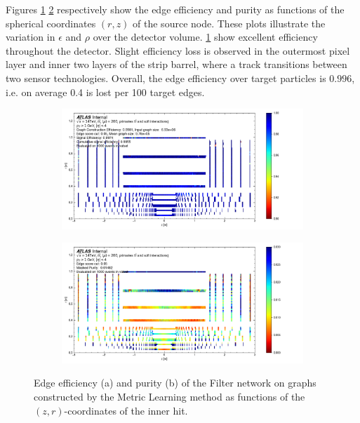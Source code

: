 Figures \ref{subfig:filter-eff-rz} \ref{subfig:filter-pur-rz} respectively show the edge efficiency and purity as functions of the spherical coordinates $(r,z)$ of the source node. 
These plots illustrate the variation in $\epsilon$ and $\rho$ over the detector volume. 
\ref{subfig:filter-eff-rz} show excellent efficiency throughout the detector. 
Slight efficiency loss is observed in the outermost pixel layer and inner two layers of the strip barrel, where a track transitions between two sensor technologies. 
Overall, the edge efficiency over target particles is $0.996$, i.e. on average 0.4 is lost per 100 target edges.

\begin{figure}[h!]
\begin{subfigure}{\textwidth}
    \centering
    \includegraphics[width=\textwidth, trim={0cm 0 3cm 0}, clip]{figures/filter/cumulative_edgewise_efficiency_rz.png}
    \caption{}
    \label{subfig:filter-eff-rz}
\end{subfigure}
\begin{subfigure}{\textwidth}
    \centering
    \includegraphics[width=\textwidth, trim={0cm 0 2.85cm 0}, clip]{figures/filter/edgewise_masked_purity_rz.png}
    \caption{}
    \label{subfig:filter-pur-rz}
\end{subfigure}
    \caption{Edge efficiency (a) and purity (b) of the Filter network on graphs constructed by the Metric Learning method as functions of the $(z,r)$-coordinates of the inner hit.}
    \label{fig:filter-eff-pur-rz}
\end{figure}

